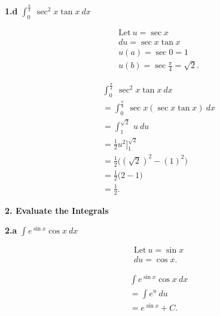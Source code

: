\documentclass{report}
\begin{document}
    \begin{mdframed}
        \textbf{1.d} $\int_{0}^{\frac{\pi}{4}}\ \sec^{2}{x}\tan{x}\ dx $
    \end{mdframed}
    \bigbreak \noindent 
    \begin{minipage}[t]{0.47\textwidth}
    \begin{align*}
        &\text{Let}\ u=\sec{x} \\
        &du = \sec{x}\tan{x} \\
        &u(a) = \sec{0} = 1 \\
        &u(b) = \sec{\frac{\pi}{4}} = \sqrt{2}
    .\end{align*}
    \end{minipage}
    \begin{minipage}[t]{0.45\textwidth}
    \begin{align*}
        &\int_{0}^{\frac{\pi}{4}}\ \sec^{2}{x}\tan{x}\ dx \\
        &=\int_{0}^{\frac{\pi}{4}}\ \sec{x}(\sec{x}\tan{x})\ dx \\
        &=\int_{1}^{\sqrt{2}}\ u\ du \\
        &=\frac{1}{2}u^{2}\bigg]^{\sqrt{2}}_{1} \\
        &= \frac{1}{2}\bigg((\sqrt{2})^{2}-(1)^{2}\bigg) \\
        &= \frac{1}{2}\bigg(2 - 1\bigg) \\
        &=\frac{1}{2}
    .\end{align*}
    \end{minipage}

    \bigbreak \noindent 
    \textbf{2. Evaluate the Integrals}

    \bigbreak \noindent 
    \begin{mdframed}
        \textbf{2.a} $\int e^{\sin{x}}\cos{x}\ dx $
    \end{mdframed}
    \bigbreak \noindent 
    \begin{minipage}[t]{0.47\textwidth}
    \begin{align*}
        &\text{Let}\ u=\sin{x} \\
        &du = \cos{x}
    .\end{align*}
    \end{minipage}
    \begin{minipage}[t]{0.36\textwidth}
    \begin{align*}
        &\int e^{\sin{x}}\cos{x}\ dx \\
        &=\int e^{u}\ du \\
        &=e^{\sin{x}} + C
    .\end{align*}
    \end{minipage}
\end{document}
